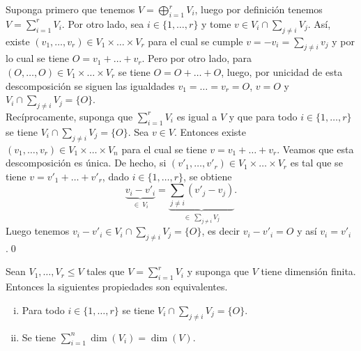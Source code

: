 \dem Suponga primero que tenemos $V=\bigoplus_{i=1}^r V_i$, luego por definici\'on tenemos $V=\sum_{i=1}^r V_i$. Por otro lado, sea $i\in\{1,\ldots,r\}$ y tome $v\in V_i\cap\sum_{j\ne i} V_j$. As\'i, existe $(v_1,\ldots,v_r)\in V_1\times\ldots\times V_r$ para el cual se cumple $v=-v_i=\sum_{j\ne i} v_j$ y por lo cual se tiene $O=v_1+\ldots+v_r$. Pero por otro lado, para $(O,\ldots,O)\in V_1\times\ldots\times V_r$ se tiene $O=O+\ldots+O$, luego, por unicidad de esta descomposici\'on se siguen las igualdades $v_1=\ldots=v_r=O$, $v=O$ y $V_i\cap\sum_{j\ne i} V_j=\{O\}$.\\
Rec\'iprocamente, suponga que $\sum_{i=1}^r V_i$ es igual a $V$ y que para todo $i\in\{1,\ldots,r\}$ se tiene $V_i\cap\sum_{j\ne i} V_j=\{O\}$. Sea $v\in V$. Entonces existe $(v_1,\ldots,v_r)\in V_1\times\ldots\times V_n$ para el cual se tiene $v=v_1+\ldots+v_r$. Veamos que esta descomposici\'on es \'unica. De hecho, si $(v'_1,\ldots,v'_r)\in V_1\times\ldots\times V_r$ es tal que se tiene $v=v'_1+\ldots+v'_r$, dado $i\in\{1,\ldots,r\}$, se obtiene
\[
\underbrace{v_i-v'_i}_{\in\ V_i}=\underbrace{\sum_{j\ne i} (v'_j-v_j)}_{\in\ \sum_{j\ne i} V_j}.
\]
Luego tenemos $v_i-v'_i\in V_i\cap\sum_{j\ne i} V_j=\{O\}$, es decir $v_i-v'_i=O$ y as\'i $v_i=v'_i$.\qed

\begin{prop}
Sean $V_1,\ldots, V_r\le V$ tales que $V=\sum_{i=1}^r V_i$ y suponga que $V$ tiene dimensi\'on finita. Entonces la siguientes propiedades son equivalentes.
\begin{enumerate}[(i)]
\item Para todo $i\in\{1,\ldots,r\}$ se tiene $V_i\cap\sum_{j\ne i} V_j=\{O\}$.
\item Se tiene $\sum_{i=1}^n \dim(V_i)=\dim(V)$.
\end{enumerate}
\end{prop}


